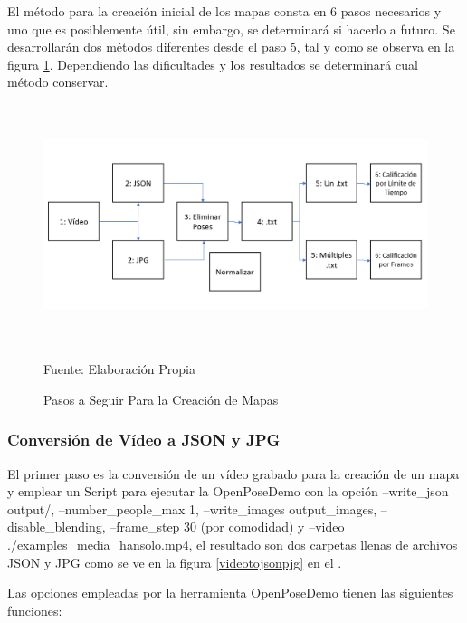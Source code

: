 El método para la creación inicial de los mapas consta en 6 pasos necesarios y uno que es posiblemente útil, sin embargo, se determinará si hacerlo a futuro. Se desarrollarán dos métodos diferentes desde el paso 5, tal y como se observa en la figura \ref{pasosaseguir}. Dependiendo las dificultades y los resultados se determinará cual método conservar.

\begin{figure}[t!]
	\centering
	\includegraphics[width=16cm,height=7cm,]{./Images/pasosaseguir.png}
	\caption{Pasos a Seguir Para la Creación de Mapas}
	\footnotesize Fuente: Elaboración Propia
	\label{pasosaseguir}
\end{figure}

\subsubsection{Conversión de Vídeo a JSON y JPG}

El primer paso es la conversión de un vídeo grabado para la creación de un mapa y emplear un Script para ejecutar la OpenPoseDemo con la opción --write\_json output/, --number\_people\_max 1, --write\_images output\_images, --disable\_blending, --frame\_step 30 (por comodidad) y --video ./examples\_media\_hansolo.mp4, el resultado son dos carpetas llenas de archivos JSON y JPG como se ve en la figura \ref{videotojsonpjg} en el . 

Las opciones empleadas por la herramienta OpenPoseDemo tienen las siguientes funciones:

